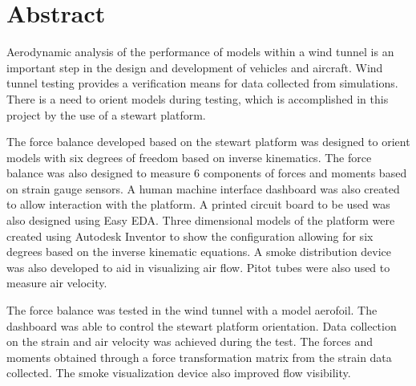 
\section*{Abstract}
\label{sec:Abstract}
Aerodynamic analysis of the performance of models within a wind tunnel is an important step in the design and development of vehicles and aircraft. Wind tunnel testing provides a verification means for data collected from simulations.
There is a need to orient models during testing, which is accomplished in this project by the use of a stewart platform.

The force balance developed based on the stewart platform was designed to orient models with six degrees of freedom based on inverse kinematics.
The force balance was also designed to measure 6 components of forces and moments based on strain gauge sensors.
A human machine interface dashboard was also created to allow interaction with the platform. A printed circuit board to be used was also designed using Easy EDA. Three dimensional models of the platform were created using Autodesk Inventor to show the configuration allowing for six degrees based on the inverse kinematic equations.
A smoke distribution device was also developed to aid in visualizing air flow. Pitot tubes were also used to measure air velocity.

The force balance was tested in the wind tunnel with a model aerofoil. The dashboard was able to control the stewart platform orientation.
Data collection on the strain and air velocity was achieved during the test. The forces and moments obtained through a force transformation matrix from the strain data collected. The smoke visualization device also improved flow visibility.

